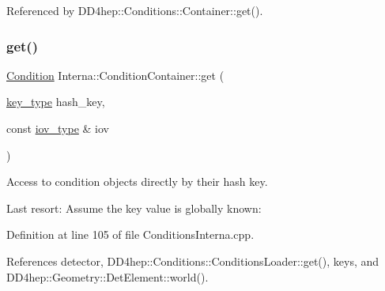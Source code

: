 Referenced by D\+D4hep\+::\+Conditions\+::\+Container\+::get().

\hypertarget{class_d_d4hep_1_1_conditions_1_1_interna_1_1_condition_container_a49d51d2eee6ff6d8d5f959338a719725}{}\label{class_d_d4hep_1_1_conditions_1_1_interna_1_1_condition_container_a49d51d2eee6ff6d8d5f959338a719725} 
\subsubsection{\texorpdfstring{get()}{get()}\hspace{0.1cm}{\footnotesize\ttfamily [2/4]}}
{\footnotesize\ttfamily \hyperlink{class_d_d4hep_1_1_conditions_1_1_condition}{Condition} Interna\+::\+Condition\+Container\+::get (\begin{DoxyParamCaption}\item[{\hyperlink{class_d_d4hep_1_1_conditions_1_1_interna_1_1_condition_container_a7a4545b4b0536565feb7346bd97c63fa}{key\+\_\+type}}]{hash\+\_\+key,  }\item[{const \hyperlink{class_d_d4hep_1_1_conditions_1_1_interna_1_1_condition_container_aa697bd92da7a05031b5eef63bb9f000b}{iov\+\_\+type} \&}]{iov }\end{DoxyParamCaption})}



Access to condition objects directly by their hash key. 

Last resort\+: Assume the key value is globally known\+: 

Definition at line 105 of file Conditions\+Interna.\+cpp.



References detector, D\+D4hep\+::\+Conditions\+::\+Conditions\+Loader\+::get(), keys, and D\+D4hep\+::\+Geometry\+::\+Det\+Element\+::world().

\hypertarget{class_d_d4hep_1_1_conditions_1_1_interna_1_1_condition_container_ac57daede261d963debdb5806bb155f8d}{}\label{class_d_d4hep_1_1_conditions_1_1_interna_1_1_condition_container_ac57daede261d963debdb5806bb155f8d} 
